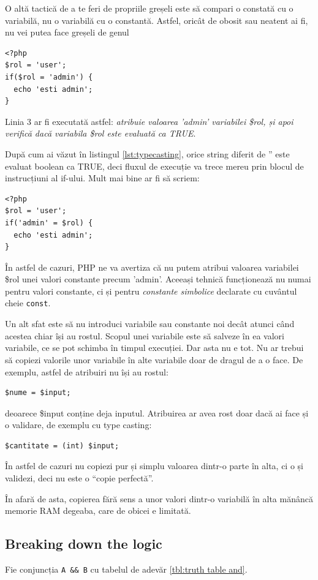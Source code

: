O altă tactică de a te feri de propriile greșeli este să compari o constată
cu o variabilă, nu o variabilă cu o constantă. Astfel, oricât de obosit
sau neatent ai fi, nu vei putea face greșeli de genul
\begin{lstlisting}
<?php
$rol = 'user';
if($rol = 'admin') {
  echo 'esti admin';
}
\end{lstlisting}
Linia 3 ar fi executată astfel: \textit{atribuie valoarea 'admin' variabilei
\$rol, și apoi verifică dacă variabila \$rol este evaluată ca TRUE}.

După cum ai văzut în listingul \ref{lst:typecasting}, orice string diferit
de '' este evaluat boolean ca TRUE, deci fluxul de execuție va trece mereu
prin blocul de instrucțiuni al if-ului. Mult mai bine ar fi să scriem:
\begin{lstlisting}
<?php
$rol = 'user';
if('admin' = $rol) {
  echo 'esti admin';
}
\end{lstlisting}
În astfel de cazuri, PHP ne va avertiza că nu putem atribui valoarea variabilei
\$rol unei valori constante precum 'admin'. Aceeași tehnică funcționează nu numai
pentru valori constante, ci și pentru \textsl{constante simbolice} declarate cu cuvântul
cheie \texttt{const}.

Un alt sfat este să nu introduci variabile sau constante noi decât atunci când
acestea chiar își au rostul. Scopul unei variabile este să salveze în ea
valori variabile, ce se pot schimba în timpul execuției. Dar asta nu e tot.
Nu ar trebui să copiezi valorile unor variabile în alte variabile doar
de dragul de a o face. De exemplu, astfel de atribuiri nu își au rostul:
\begin{lstlisting}
$nume = $input;
\end{lstlisting}
deoarece \$input conține deja inputul. Atribuirea ar avea rost doar dacă ai face
și o validare, de exemplu cu type casting:
\begin{lstlisting}
$cantitate = (int) $input;
\end{lstlisting}
În astfel de cazuri nu copiezi pur și simplu valoarea dintr-o parte în alta, ci
o și validezi, deci nu este o ``copie perfectă''.

În afară de asta, copierea fără sens a unor valori dintr-o variabilă în alta mănâncă
memorie RAM degeaba, care de obicei e limitată.

\subsection{Breaking down the logic}
Fie conjuncția \texttt{A \&\& B} cu tabelul de adevăr \ref{tbl:truth table and}.

